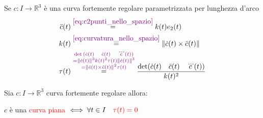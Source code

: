         \begin{osservazione}
        Se $c: I \to \mathbb{R}^3$ è una curva fortemente regolare parametrizzata per lunghezza d'arco 
        \begin{align}
        \ddot{c}(t) &\overset{\textcolor{violet}{\eqref{eq:c2punti_nello_spazio}}}{=} k(t) e_2(t) \label{eq:curva_nello_spazio_parametrizzata_per_lunghezza_darco_1} \\
        k(t) &\overset{\textcolor{violet}{\eqref{eq:curvatura_nello_spazio}}}{=} \lVert \dot{c}(t) \times \ddot{c}(t) \rVert \label{eq:curva_nello_spazio_parametrizzata_per_lunghezza_darco_2} \\
        \tau(t) &\overset{\textcolor{violet}{\substack{\det{ \left( \dot{c}(t) \quad \ddot{c}(t) \quad \dddot{c}(t) \right) }   \\ = \lVert\dot{c}(t)\rVert^3 k(t)^2 \tau(t) \lVert\dot{c}(t)\rVert^3 \\ = \lVert \dot{c}(t) \times \ddot{c}(t) \rVert^2 \tau(t)}}}{=} \frac{ \det(\dot{c}(t) \quad \ddot{c}(t) \quad \dddot{c}(t)) }{k(t)^2} \label{eq:curva_nello_spazio_parametrizzata_per_lunghezza_darco_3}
        \end{align}
        \end{osservazione}
        \newpage
        \begin{proposizione}
        \label{prop:curva_piana_nello_spazio}
        Sia $c \colon I \to \mathbb{R}^3$ curva fortemente regolare allora:

        $c$ è una \textcolor{red}{curva piana} $\iff \forall t \in I \quad \textcolor{red}{\tau(t) = 0}$
        \end{proposizione}
